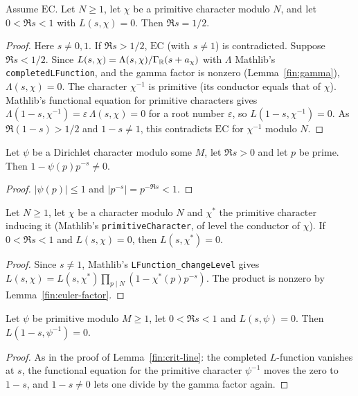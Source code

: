 \begin{lemma}\label{fin:crit-line}
Assume $\mathrm{EC}$. Let $N\ge1$, let $\chi$ be a primitive character modulo
$N$, and let $0<\Re s<1$ with $L(s,\chi)=0$. Then $\Re s=1/2$.
\end{lemma}
\begin{proof}
Here $s\ne0,1$. If $\Re s>1/2$, $\mathrm{EC}$ (with $s\ne1$) is contradicted.
Suppose $\Re s<1/2$. Since $L(s,\chi)=\Lambda(s,\chi)/\Gamma_{\mathbb{R}}(s+a_{\chi})$ with
$\Lambda$ Mathlib's \texttt{completedLFunction}, and the gamma factor is
nonzero (Lemma~\ref{fin:gamma}), $\Lambda(s,\chi)=0$. The character $\chi^{-1}$
is primitive (its conductor equals that of $\chi$). Mathlib's functional
equation for primitive characters gives
$\Lambda(1-s,\chi^{-1})=\varepsilon\,\Lambda(s,\chi)=0$ for a root number
$\varepsilon$, so $L(1-s,\chi^{-1})=0$. As $\Re(1-s)>1/2$ and $1-s\ne1$, this
contradicts $\mathrm{EC}$ for $\chi^{-1}$ modulo $N$.
\end{proof}

\begin{lemma}\label{fin:euler-factor}
Let $\psi$ be a Dirichlet character modulo some $M$, let $\Re s>0$ and let $p$
be prime. Then $1-\psi(p)p^{-s}\ne0$.
\end{lemma}
\begin{proof}
$|\psi(p)|\le1$ and $|p^{-s}|=p^{-\Re s}<1$.
\end{proof}

\begin{lemma}\label{fin:prim-zero}
Let $N\ge1$, let $\chi$ be a character modulo $N$ and $\chi^{\ast}$ the primitive
character inducing it (Mathlib's \texttt{primitiveCharacter}, of level the
conductor of $\chi$). If $0<\Re s<1$ and $L(s,\chi)=0$, then $L(s,\chi^{\ast})=0$.
\end{lemma}
\begin{proof}
Since $s\ne1$, Mathlib's \texttt{LFunction\_changeLevel} gives
$L(s,\chi)=L(s,\chi^{\ast})\prod_{p\mid N}(1-\chi^{\ast}(p)p^{-s})$. The product is
nonzero by Lemma~\ref{fin:euler-factor}.
\end{proof}

\begin{lemma}[reflection]\label{fin:prim-reflect}
Let $\psi$ be primitive modulo $M\ge1$, let $0<\Re s<1$ and $L(s,\psi)=0$. Then
$L(1-s,\psi^{-1})=0$.
\end{lemma}
\begin{proof}
As in the proof of Lemma~\ref{fin:crit-line}: the completed $L$-function
vanishes at $s$, the functional equation for the primitive character
$\psi^{-1}$ moves the zero to $1-s$, and $1-s\ne0$ lets one divide by the gamma
factor again.
\end{proof}

